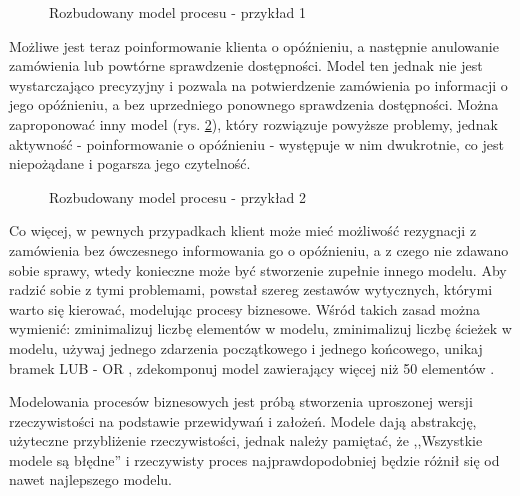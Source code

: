 \begin{figure}[h]
	\caption{\label{fig:complicated_business_process_1}Rozbudowany model procesu - przykład 1}
\end{figure}

Możliwe jest teraz poinformowanie klienta o opóźnieniu, a następnie anulowanie zamówienia lub powtórne sprawdzenie dostępności. Model ten jednak nie jest wystarczająco precyzyjny i pozwala na potwierdzenie zamówienia po informacji o jego opóźnieniu, a bez uprzedniego ponownego sprawdzenia dostępności. Można zaproponować inny model (rys. \ref{fig:complicated_business_process_2}), który rozwiązuje powyższe problemy, jednak aktywność - poinformowanie o opóźnieniu - występuje w nim dwukrotnie, co jest niepożądane i  pogarsza jego czytelność.

\begin{figure}[h]
	\caption{\label{fig:complicated_business_process_2}Rozbudowany model procesu - przykład 2}
\end{figure}

Co więcej, w pewnych przypadkach klient może mieć możliwość rezygnacji z zamówienia bez ówczesnego informowania go o opóźnieniu, a z czego nie zdawano sobie sprawy, wtedy konieczne może być stworzenie zupełnie innego modelu. Aby radzić sobie z tymi problemami, powstał szereg zestawów wytycznych, którymi warto się kierować, modelując procesy biznesowe. Wśród takich zasad można wymienić: zminimalizuj liczbę elementów w modelu, zminimalizuj liczbę ścieżek w modelu, używaj jednego zdarzenia początkowego i jednego końcowego, unikaj bramek LUB - OR , zdekomponuj model zawierający więcej niż 50 elementów \cite{7PMG}.

Modelowania procesów biznesowych jest próbą stworzenia uproszonej wersji rzeczywistości na podstawie przewidywań i założeń. Modele dają abstrakcję, użyteczne przybliżenie rzeczywistości, jednak należy pamiętać, że ,,Wszystkie modele są błędne'' i rzeczywisty proces najprawdopodobniej będzie różnił się od nawet najlepszego modelu. 


